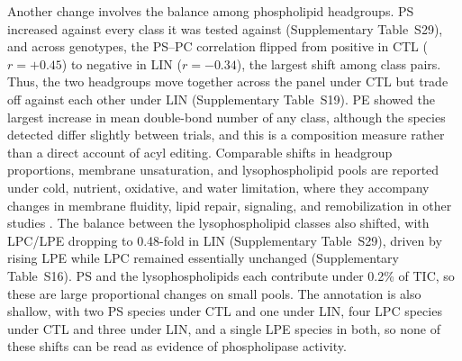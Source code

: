 \documentclass[9pt,twocolumn,twoside]{rilabRxiv}
\begin{document}
Another change involves the balance among phospholipid headgroups. PS increased against every class it was tested against (Supplementary Table~S29), and across genotypes, the PS--PC correlation flipped from positive in CTL ($r=+0.45$) to negative in LIN ($r=-0.34$), the largest shift among class pairs. Thus, the two headgroups move together across the panel under CTL but trade off against each other under LIN (Supplementary Table~S19). PE showed the largest increase in mean double-bond number of any class, although the species detected differ slightly between trials, and this is a composition measure rather than a direct account of acyl editing. Comparable shifts in headgroup proportions, membrane unsaturation, and lysophospholipid pools are reported under cold, nutrient, oxidative, and water limitation, where they accompany changes in membrane fluidity, lipid repair, signaling, and remobilization in other studies \citep{Hou2016, Rawat2021, Yan2025, Zhang2020}. The balance between the lysophospholipid classes also shifted, with LPC/LPE dropping to 0.48-fold in LIN (Supplementary Table~S29), driven by rising LPE while LPC remained essentially unchanged (Supplementary Table~S16). PS and the lysophospholipids each contribute under 0.2\% of TIC, so these are large proportional changes on small pools. The annotation is also shallow, with two PS species under CTL and one under LIN, four LPC species under CTL and three under LIN, and a single LPE species in both, so none of these shifts can be read as evidence of phospholipase activity.
\end{document}
